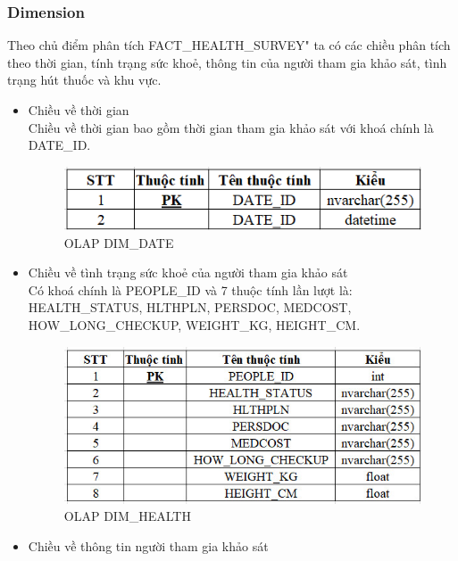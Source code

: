 \subsubsection{Dimension}
Theo chủ điểm phân tích FACT\_HEALTH\_SURVEY" ta có các chiều phân tích theo thời gian, tính trạng sức khoẻ, thông tin của người tham gia khảo sát, tình trạng hút thuốc và khu vực.
\begin{itemize}
    \item Chiều về thời gian\\
    Chiều về thời gian bao gồm thời gian tham gia khảo sát với khoá chính là DATE\_ID.
    \begin{center}
            \begin{figure}[!h]
                \centering
                \includegraphics[scale = 0.8]{van/dim_date.jpg}
              \caption{OLAP DIM\_DATE}
            \end{figure}
    \end{center}
    \item Chiều về tình trạng sức khoẻ của người tham gia khảo sát\\
    Có khoá chính là PEOPLE\_ID và 7 thuộc tính lần lượt là: HEALTH\_STATUS, HLTHPLN, PERSDOC, MEDCOST, HOW\_LONG\_CHECKUP, WEIGHT\_KG, HEIGHT\_CM.
    \begin{center}
            \begin{figure}[!h]
                \centering
                \includegraphics[scale = 0.8]{van/oltp dim heath.png}
              \caption{OLAP DIM\_HEALTH}
            \end{figure}
    \end{center}
    \item Chiều về thông tin người tham gia khảo sát\\

\end{itemize}
